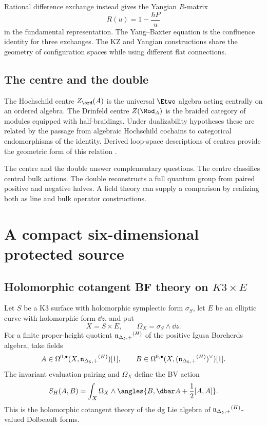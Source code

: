 Rational difference exchange instead gives the Yangian $R$-matrix
\[
 R(u)=1-\frac{\hbar P}{u}
\]
in the fundamental representation. The Yang--Baxter equation is the confluence identity for three exchanges. The KZ and Yangian constructions share the geometry of configuration spaces while using different flat connections.

\chapter{The centre and the double}
The Hochschild centre $Z_{\ord}(A)$ is the universal $\Etwo$ algebra acting centrally on an ordered algebra. The Drinfeld centre $Z(\Mod_A)$ is the braided category of modules equipped with half-braidings. Under dualizability hypotheses these are related by the passage from algebraic Hochschild cochains to categorical endomorphisms of the identity. Derived loop-space descriptions of centres provide the geometric form of this relation \cite{BenZviFrancisNadler}.

The centre and the double answer complementary questions. The centre classifies central bulk actions. The double reconstructs a full quantum group from paired positive and negative halves. A field theory can supply a comparison by realizing both as line and bulk operator constructions.


\part{A compact six-dimensional protected source}

\chapter{Holomorphic cotangent BF theory on \texorpdfstring{$K3\times E$}{K3 x E}}
Let $S$ be a K3 surface with holomorphic symplectic form $\sigma_S$, let $E$ be an elliptic curve with holomorphic form $\dd z$, and put
\[
 X=S\times E,
 \qquad
 \Omega_X=\sigma_S\wedge\dd z.
\]
For a finite proper-height quotient ${\mathfrak n_{\Delta_5,+}}^{(H)}$ of the positive Igusa Borcherds algebra, take fields
\[
 A\in\Omega^{0,\bullet}(X,{\mathfrak n_{\Delta_5,+}}^{(H)})[1],
 \qquad
 B\in\Omega^{0,\bullet}(X,({\mathfrak n_{\Delta_5,+}}^{(H)})^\vee)[1].
\]
The invariant evaluation pairing and $\Omega_X$ define the BV action
\begin{equation}\label{eq:vol4-compact-hbf}
 S_H(A,B)=
 \int_X\Omega_X\wedge
 \angles{B,\dbar A+\frac12[A,A]}.
\end{equation}
This is the holomorphic cotangent theory of the dg Lie algebra of ${\mathfrak n_{\Delta_5,+}}^{(H)}$-valued Dolbeault forms.


